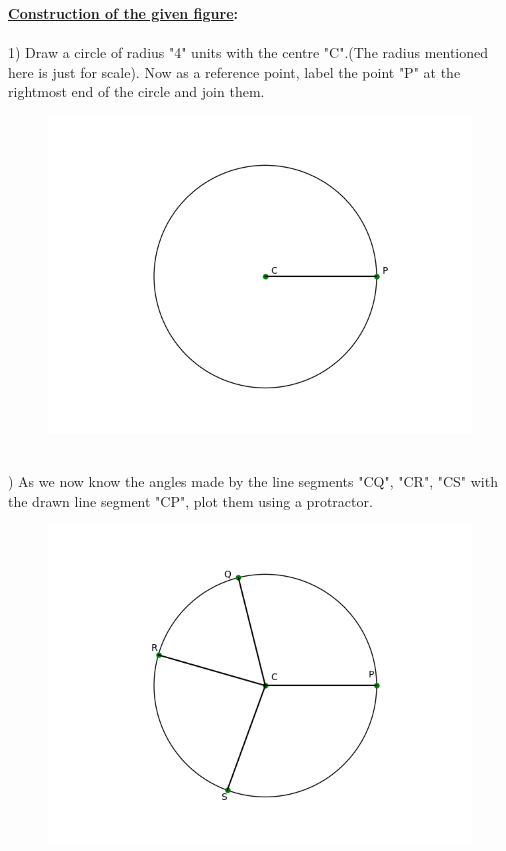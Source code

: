 \documentclass[8pt, twocolumn]{article}
\begin{document}
\textbf{\underline{Construction of the given figure}: }\\\\
1) Draw a circle of radius "4" units with the centre "C".(The radius mentioned here is just for scale). Now as a reference point, label the point "P" at the rightmost end of the circle and join them.
\begin{figure}[ht]
    \centering
    \includegraphics[scale = 0.5]{figs/cnstrct_fig1.png}
\end{figure}\\
) As we now know the angles made by the line segments "CQ", "CR", "CS" with the drawn line segment "CP", plot them using a protractor.
\begin{figure}[ht]
    \centering
    \includegraphics[scale = 0.5]{figs/cnstrct_fig2.png}
\end{figure}\\
\end{document}
